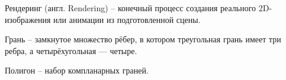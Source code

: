 
Рендеринг (англ. Rendering) -- конечный процесс создания реального 2D-изображения или анимации из подготовленной сцены.

Грань -- замкнутое множество рёбер, в котором треугольная грань имеет три ребра, а четырёхугольная — четыре. 

Полигон -- набор компланарных граней.

\clearpage
